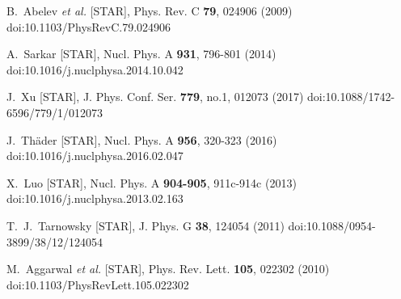
\begin{thebibliography}{99}


B.~Abelev \textit{et al.} [STAR],
Phys. Rev. C \textbf{79}, 024906 (2009)
doi:10.1103/PhysRevC.79.024906

A.~Sarkar [STAR],
Nucl. Phys. A \textbf{931}, 796-801 (2014)
doi:10.1016/j.nuclphysa.2014.10.042

J.~Xu [STAR],
J. Phys. Conf. Ser. \textbf{779}, no.1, 012073 (2017)
doi:10.1088/1742-6596/779/1/012073

J.~Thäder [STAR],
Nucl. Phys. A \textbf{956}, 320-323 (2016)
doi:10.1016/j.nuclphysa.2016.02.047

X.~Luo [STAR],
Nucl. Phys. A \textbf{904-905}, 911c-914c (2013)
doi:10.1016/j.nuclphysa.2013.02.163

T.~J.~Tarnowsky [STAR],
J. Phys. G \textbf{38}, 124054 (2011)
doi:10.1088/0954-3899/38/12/124054

M.~Aggarwal \textit{et al.} [STAR],
Phys. Rev. Lett. \textbf{105}, 022302 (2010)
doi:10.1103/PhysRevLett.105.022302


\end{thebibliography}
